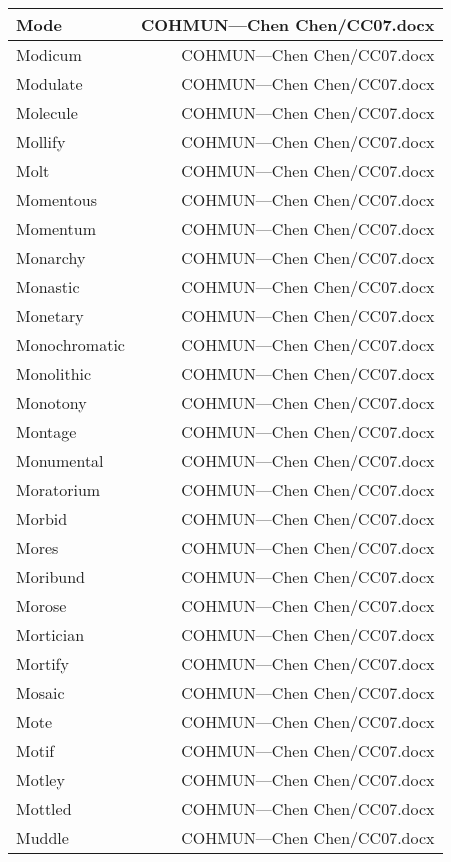 \documentclass{article}
\begin{document}
\begin{center}
\begin{longtable}{|l|r|}
\hline
Mode  &  COHMUN---Chen Chen/CC07.docx\\  
\hline
Modicum  &  COHMUN---Chen Chen/CC07.docx\\  
\hline
Modulate  &  COHMUN---Chen Chen/CC07.docx\\  
\hline
Molecule  &  COHMUN---Chen Chen/CC07.docx\\  
\hline
Mollify  &  COHMUN---Chen Chen/CC07.docx\\  
\hline
Molt  &  COHMUN---Chen Chen/CC07.docx\\  
\hline
Momentous  &  COHMUN---Chen Chen/CC07.docx\\  
\hline
Momentum  &  COHMUN---Chen Chen/CC07.docx\\  
\hline
Monarchy  &  COHMUN---Chen Chen/CC07.docx\\  
\hline
Monastic  &  COHMUN---Chen Chen/CC07.docx\\  
\hline
Monetary  &  COHMUN---Chen Chen/CC07.docx\\  
\hline
Monochromatic  &  COHMUN---Chen Chen/CC07.docx\\  
\hline
Monolithic  &  COHMUN---Chen Chen/CC07.docx\\  
\hline
Monotony  &  COHMUN---Chen Chen/CC07.docx\\  
\hline
Montage  &  COHMUN---Chen Chen/CC07.docx\\  
\hline
Monumental  &  COHMUN---Chen Chen/CC07.docx\\  
\hline
Moratorium  &  COHMUN---Chen Chen/CC07.docx\\  
\hline
Morbid  &  COHMUN---Chen Chen/CC07.docx\\  
\hline
Mores  &  COHMUN---Chen Chen/CC07.docx\\  
\hline
Moribund  &  COHMUN---Chen Chen/CC07.docx\\  
\hline
Morose  &  COHMUN---Chen Chen/CC07.docx\\  
\hline
Mortician  &  COHMUN---Chen Chen/CC07.docx\\  
\hline
Mortify  &  COHMUN---Chen Chen/CC07.docx\\  
\hline
Mosaic  &  COHMUN---Chen Chen/CC07.docx\\  
\hline
Mote  &  COHMUN---Chen Chen/CC07.docx\\  
\hline
Motif  &  COHMUN---Chen Chen/CC07.docx\\  
\hline
Motley  &  COHMUN---Chen Chen/CC07.docx\\  
\hline
Mottled  &  COHMUN---Chen Chen/CC07.docx\\  
\hline
Muddle  &  COHMUN---Chen Chen/CC07.docx\\  

\end{longtable}
\end{center}
\end{document}
